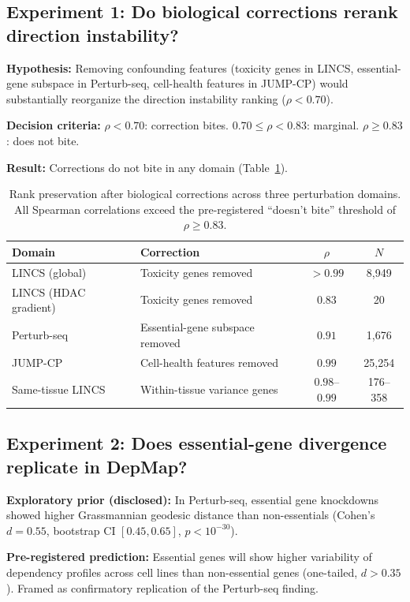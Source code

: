 \documentclass[11pt]{article}
\begin{document}
\subsection{Experiment 1: Do biological corrections rerank direction instability?}

\textbf{Hypothesis:} Removing confounding features (toxicity genes in
LINCS, essential-gene subspace in Perturb-seq, cell-health features in
JUMP-CP) would substantially reorganize the direction instability ranking
($\rho < 0.70$).

\textbf{Decision criteria:} $\rho < 0.70$: correction bites.
$0.70 \leq \rho < 0.83$: marginal. $\rho \geq 0.83$: does not bite.

\textbf{Result:} Corrections do not bite in any domain (Table~\ref{tab:robustness}).

\begin{table}[h]
\centering
\caption{Rank preservation after biological corrections across three
perturbation domains. All Spearman correlations exceed the pre-registered
``doesn't bite'' threshold of $\rho \geq 0.83$.}
\label{tab:robustness}
\begin{tabular}{llcc}
\toprule
Domain & Correction & $\rho$ & $N$ \\
\midrule
LINCS (global) & Toxicity genes removed & $>0.99$ & 8{,}949 \\
LINCS (HDAC gradient) & Toxicity genes removed & $0.83$ & 20 \\
Perturb-seq & Essential-gene subspace removed & $0.91$ & 1{,}676 \\
JUMP-CP & Cell-health features removed & $0.99$ & 25{,}254 \\
\midrule
Same-tissue LINCS & Within-tissue variance genes & $0.98$--$0.99$ & 176--358 \\
\bottomrule
\end{tabular}
\end{table}

\subsection{Experiment 2: Does essential-gene divergence replicate in DepMap?}

\textbf{Exploratory prior (disclosed):} In Perturb-seq, essential gene
knockdowns showed higher Grassmannian geodesic distance than non-essentials
(Cohen's $d = 0.55$, bootstrap CI $[0.45, 0.65]$, $p < 10^{-30}$).

\textbf{Pre-registered prediction:} Essential genes will show higher
variability of dependency profiles across cell lines than non-essential
genes (one-tailed, $d > 0.35$). Framed as confirmatory replication of
the Perturb-seq finding.
\end{document}
